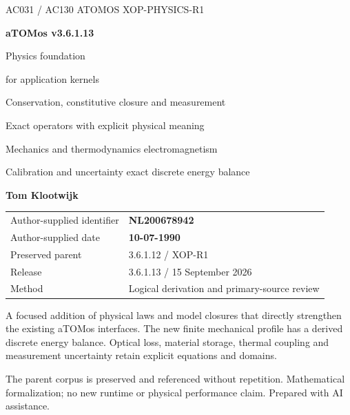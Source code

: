 

\begin{titlepage}\thispagestyle{empty}
{\sffamily\color{accent}\large AC031 / AC130 ATOMOS \hfill XOP-PHYSICS-R1}\par
\vspace{18mm}
{\sffamily\bfseries\fontsize{43}{51}\selectfont\color{ink}aTOMos v3.6.1.13}\par
\vspace{10mm}
{\sffamily\fontsize{30}{37}\selectfont Physics foundation\par for application kernels}\par
\vspace{9mm}
{\sffamily\fontsize{19}{25}\selectfont\color{gold}Conservation, constitutive closure and measurement\par Exact operators with explicit physical meaning}\par
\vspace{11mm}
{\large Mechanics and thermodynamics \;\textperiodcentered\; electromagnetism\par
Calibration and uncertainty \;\textperiodcentered\; exact discrete energy balance}\par
\vspace{13mm}
{\sffamily\bfseries\Large Tom Klootwijk}\par
\begin{tabular}{@{}ll@{}}
Author-supplied identifier & \textbf{NL200678942}\\
Author-supplied date & \textbf{10-07-1990}\\
Preserved parent & 3.6.1.12 / XOP-R1\\
Release & 3.6.1.13 / 15 September 2026\\
Method & Logical derivation and primary-source review\\
\end{tabular}
\vfill
\begin{panel}
A focused addition of physical laws and model closures that directly strengthen
the existing aTOMos interfaces. The new finite mechanical profile has a derived
discrete energy balance. Optical loss, material storage, thermal coupling and
measurement uncertainty retain explicit equations and domains.
\end{panel}
{\small\color{muted}The parent corpus is preserved and referenced without repetition.
Mathematical formalization; no new runtime or physical performance claim.
Prepared with AI assistance.}
\end{titlepage}
\setcounter{page}{2}
